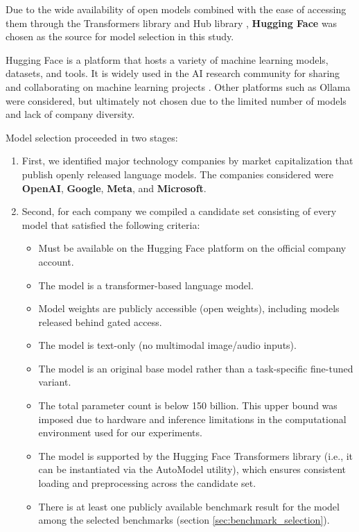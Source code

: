 Due to the wide availability of open models combined with the ease of accessing them through the Transformers library \cite{Wolf2019} and Hub library \cite{HuggingFaceHub}, \textbf{Hugging Face} was chosen as the source for model selection in this study.

Hugging Face is a platform that hosts a variety of machine learning models, datasets, and tools. It is widely used in the AI research community for sharing and collaborating on machine learning projects \cite{HuggingFaceResearchGate, HuggingFaceMain}. Other platforms such as Ollama \cite{Ollama} were considered, but ultimately not chosen due to the limited number of models and lack of company diversity. 

Model selection proceeded in two stages:

\begin{enumerate}
    \item First, we identified major technology companies by market capitalization that publish openly released language models. The companies considered were \textbf{OpenAI}, \textbf{Google}, \textbf{Meta}, and \textbf{Microsoft}.
    \item Second, for each company we compiled a candidate set consisting of every model that satisfied the following criteria:
    
        \begin{itemize}
            \item Must be available on the Hugging Face platform on the official company account.
            \item The model is a transformer-based language model.
            \item Model weights are publicly accessible (open weights), including models released behind
            gated access.
            \item The model is text-only (no multimodal image/audio inputs).
            \item The model is an original base model rather than a task-specific fine-tuned variant.
            \item The total parameter count is below 150 billion. This upper bound was imposed due to
            hardware and inference limitations in the computational environment used for our experiments.
            \item The model is supported by the Hugging Face Transformers library \cite{Wolf2019} (i.e., it can be
            instantiated via the AutoModel utility), which ensures consistent loading and
            preprocessing across the candidate set.
            \item There is at least one publicly available benchmark result for the model among the selected benchmarks (section \ref{sec:benchmark_selection}).
        \end{itemize}

\end{enumerate}

